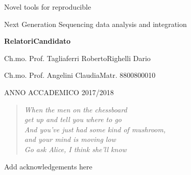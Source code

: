 \documentclass[b5paper, oneside, british, intoc, bibliograph=totoc, index=totoc, BCOR10mm, twoside, openright]{book}
\numberwithin{equation}{section}
\numberwithin{figure}{section}
\begin{document}
\vspace{1.5cm}

\begin{center}
Novel tools for reproducible 

Next Generation Sequencing data analysis and integration
\par\end{center}

\vspace{1.5cm}

\textbf{\large{}Relatori}\hfill{}\textbf{\large{}Candidato}{\large \par}

Ch.mo. Prof. Tagliaferri Roberto\hfill{}Righelli Dario

Ch.mo. Prof. Angelini Claudia\hfill{}Matr. 8800800010

\vspace{1.5cm}

\begin{center}
ANNO ACCADEMICO 2017/2018
\par\end{center}

\cleardoublepage

\begin{quotation}
\begin{flushright}
\textit{
When the men on the chessboard\\get up and tell you where to go\\
And you've just had some kind of mushroom,\\and your mind is moving low\\
Go ask Alice, I think she'll know\\
}
\par\end{flushright}
\end{quotation}


\cleardoublepage
{}

Add acknowledgements here
%

\cleardoublepage


%


\hypersetup{hidelinks} %

\pagestyle{plain}\tableofcontents

\cleardoublepage{}
\pagestyle{fancy}
\end{document}

